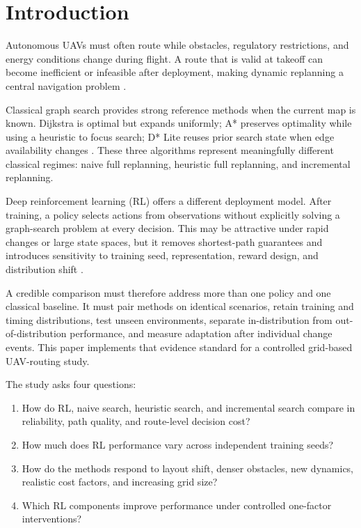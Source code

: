 \section{Introduction}

Autonomous UAVs must often route while obstacles, regulatory restrictions, and
energy conditions change during flight. A route that is valid at takeoff can
become inefficient or infeasible after deployment, making dynamic replanning a
central navigation problem \cite{ghambari2024survey}.

Classical graph search provides strong reference methods when the current map
is known. Dijkstra is optimal but expands uniformly; A* preserves optimality
while using a heuristic to focus search; D* Lite reuses prior search state when
edge availability changes \cite{hart1968astar,koenig2005dstarlite}. These three
algorithms represent meaningfully different classical regimes: naive full
replanning, heuristic full replanning, and incremental replanning.

Deep reinforcement learning (RL) offers a different deployment model. After
training, a policy selects actions from observations without explicitly
solving a graph-search problem at every decision. This may be attractive under
rapid changes or large state spaces, but it removes shortest-path guarantees
and introduces sensitivity to training seed, representation, reward design,
and distribution shift \cite{vanhasselt2016double,andrychowicz2017her,
henderson2018deep}.

A credible comparison must therefore address more than one policy and one
classical baseline. It must pair methods on identical scenarios, retain
training and timing distributions, test unseen environments, separate
in-distribution from out-of-distribution performance, and measure adaptation
after individual change events. This paper implements that evidence standard
for a controlled grid-based UAV-routing study.

The study asks four questions:
\begin{enumerate}
    \item How do RL, naive search, heuristic search, and incremental search
    compare in reliability, path quality, and route-level decision cost?
    \item How much does RL performance vary across independent training seeds?
    \item How do the methods respond to layout shift, denser obstacles, new
    dynamics, realistic cost factors, and increasing grid size?
    \item Which RL components improve performance under controlled
    one-factor interventions?
\end{enumerate}

